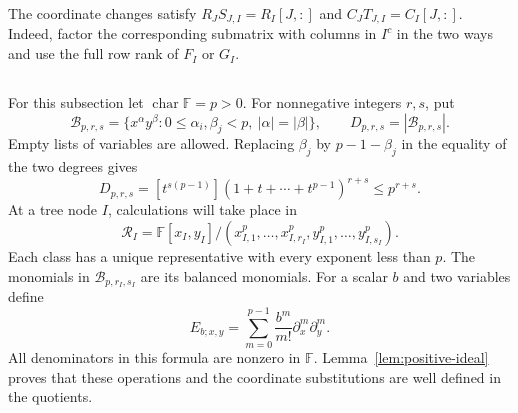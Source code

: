 \documentclass[11pt,reqno]{amsart}
\theoremstyle{remark}
\numberwithin{equation}{section}
\newcommand{\F}{\mathbb F}
\begin{document}
The coordinate changes satisfy
\(R_J S_{J,I}=R_I[J,:]\) and \(C_J T_{J,I}=C_I[J,:]\).
Indeed, factor the corresponding submatrix with columns in \(I^c\)
in the two ways and use the full row rank of \(F_I\) or \(G_I\).

\subsection{}

For this subsection let \(\operatorname{char}\F=p>0\). For
nonnegative integers \(r,s\), put
\begin{equation}\label{eq:positive-basis}
 \mathcal B_{p,r,s}=
 \{x^\alpha y^\beta:0\leq\alpha_i,\beta_j<p,\
                          |\alpha|=|\beta|\},\qquad
 D_{p,r,s}=|\mathcal B_{p,r,s}|.
\end{equation}
Empty lists of variables are allowed. Replacing \(\beta_j\) by
\(p-1-\beta_j\) in the equality of the two degrees gives
\begin{equation}\label{eq:positive-dimension}
 D_{p,r,s}=[t^{s(p-1)}](1+t+\cdots+t^{p-1})^{r+s}
          \leq p^{r+s}.
\end{equation}
At a tree node \(I\), calculations will take place in
\begin{equation}\label{eq:positive-quotient}
 \mathcal R_I=
 \F[x_I,y_I]/(x_{I,1}^{p},\ldots,x_{I,r_I}^{p},
                         y_{I,1}^{p},\ldots,y_{I,s_I}^{p}).
\end{equation}
Each class has a unique representative with every exponent less
than \(p\). The monomials in \(\mathcal B_{p,r_I,s_I}\) are its
balanced monomials. For a scalar \(b\) and two variables define
\begin{equation}\label{eq:positive-pair}
 E_{b;x,y}=\sum_{m=0}^{p-1}\frac{b^m}{m!}
                         \partial_x^m\partial_y^m.
\end{equation}
All denominators in this formula are nonzero in \(\F\).
Lemma~\ref{lem:positive-ideal} proves that these operations and the
coordinate substitutions are well defined in the quotients.



\subsection{}
\end{document}
